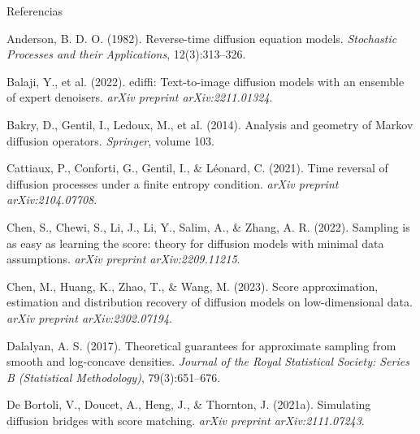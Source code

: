 \documentclass[aspectratio=169,xcolor=dvipsnames, t, spanish]{beamer}
\begin{document}
    \begin{frame}{Referencias}
        \footnotesize{
            \begin{thebibliography}{99}
    
                 Anderson, B. D. O. (1982).
                \newblock Reverse-time diffusion equation models.
                \newblock \emph{Stochastic Processes and their Applications}, 12(3):313–326.
    
                 Balaji, Y., et al. (2022).
                \newblock ediffi: Text-to-image diffusion models with an ensemble of expert denoisers.
                \newblock \emph{arXiv preprint arXiv:2211.01324}.
    
                 Bakry, D., Gentil, I., Ledoux, M., et al. (2014).
                \newblock Analysis and geometry of Markov diffusion operators.
                \newblock \emph{Springer}, volume 103.
    
                 Cattiaux, P., Conforti, G., Gentil, I., \& Léonard, C. (2021).
                \newblock Time reversal of diffusion processes under a finite entropy condition.
                \newblock \emph{arXiv preprint arXiv:2104.07708}.
    
                 Chen, S., Chewi, S., Li, J., Li, Y., Salim, A., \& Zhang, A. R. (2022).
                \newblock Sampling is as easy as learning the score: theory for diffusion models with minimal data assumptions.
                \newblock \emph{arXiv preprint arXiv:2209.11215}.
    
                 Chen, M., Huang, K., Zhao, T., \& Wang, M. (2023).
                \newblock Score approximation, estimation and distribution recovery of diffusion models on low-dimensional data.
                \newblock \emph{arXiv preprint arXiv:2302.07194}.
    
                 Dalalyan, A. S. (2017).
                \newblock Theoretical guarantees for approximate sampling from smooth and log-concave densities.
                \newblock \emph{Journal of the Royal Statistical Society: Series B (Statistical Methodology)}, 79(3):651–676.
    
                 De Bortoli, V., Doucet, A., Heng, J., \& Thornton, J. (2021a).
                \newblock Simulating diffusion bridges with score matching.
                \newblock \emph{arXiv preprint arXiv:2111.07243}.
    

\end{thebibliography}}
\end{frame}
\end{document}
